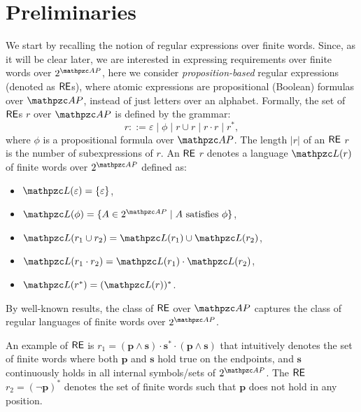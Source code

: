 \section{Preliminaries}\label{sect:backgrRegex}
We start by recalling the notion of regular expressions over finite words. 
Since, as it will be clear later, we are interested in expressing requirements 
over finite words over $2^{\Prop}$, here we consider \emph{proposition-based} 
regular expressions (denoted as $\mathsf{RE}$s), where atomic expressions are 
propositional (Boolean) formulas over $\Prop$, instead of just letters over an 
alphabet. Formally, the set of $\mathsf{RE}$s $r$ over $\Prop$ is defined by the 
grammar:
%
\[
    r ::= \varepsilon\;\vert\; \phi\;\vert\; r\cup r\;\vert\; r\cdot r\;\vert\; r^{*},
\]
where $\phi$ is a propositional formula over $\Prop$. The length $|r|$ of an $\mathsf{RE}$ $r$ is the number of subexpressions of $r$.
 An $\mathsf{RE}$ $r$ denotes a language $\Lang(r)$ of finite words over $2^{\Prop}$ defined as:
\begin{itemize}
  \item $\Lang(\varepsilon)=\{\varepsilon\}$,
  \item $\Lang(\phi)=\{A\in 2^{\Prop}\mid A \text{ satisfies }\phi\}$,
  \item $\Lang(r_1\cup r_2)=\Lang(r_1)\cup \Lang(r_2)$,
  \item $\Lang(r_1\cdot r_2)=\Lang(r_1)\cdot \Lang(r_2)$, 
\item $\Lang(r^{*})=(\Lang(r))^{*}$.
\end{itemize}
By well-known results,  the class of $\mathsf{RE}$ over $\Prop$ captures the class of regular languages of finite words over $2^{\Prop}$.

\begin{example}\label{example:re}
An example of  $\mathsf{RE}$ is $r_1=\mathbf{(p\wedge s)} \cdot \mathbf{s}^* \cdot \mathbf{(p\wedge s)}$ that intuitively denotes the set of finite words where both $\mathbf{p}$ and $\mathbf{s}$ hold true on the endpoints, and $\mathbf{s}$ continuously holds in all internal symbols/sets of $2^{\Prop}$. The $\mathsf{RE}$ $r_2=\mathbf{(\neg p)}^*$ denotes the set of finite words such that $\mathbf{p}$ does not hold in any position.
\end{example}

